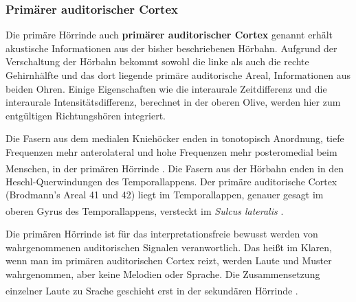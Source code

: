 \documentclass[12pt,a4paper,pdftex]{article}
\begin{document}

\subsubsection*{Primärer auditorischer Cortex}

Die primäre Hörrinde auch \textbf{primärer auditorischer Cortex}  genannt erhält akustische Informationen aus der bisher beschriebenen Hörbahn. Aufgrund der Verschaltung der Hörbahn bekommt sowohl die linke als auch die rechte Gehirnhälfte und das dort liegende primäre auditorische Areal, Informationen aus beiden Ohren. Einige Eigenschaften wie die interaurale Zeitdifferenz und die interaurale Intensitätsdifferenz, berechnet in der oberen Olive, werden hier zum entgültigen Richtungshören integriert. 

Die Fasern aus dem medialen Kniehöcker enden in tonotopisch Anordnung, tiefe Frequenzen mehr anterolateral und hohe Frequenzen mehr posteromedial beim Menschen, in der primären Hörrinde \textsuperscript{\cite[9.9]{trepel2011neuroanatomie}}. Die Fasern aus der Hörbahn enden in den Heschl-Querwindungen des Temporallappens. Der primäre auditorische Cortex (Brodmann's Areal 41 und 42) liegt im Temporallappen, genauer gesagt im oberen Gyrus des Temporallappens, versteckt im \textit{Sulcus lateralis} \textsuperscript{\cite[13]{crossman2014neuroanatomy}}. 

Die primären Hörrinde ist für das interpretationsfreie bewusst werden von wahrgenommenen auditorischen Signalen veranwortlich. Das heißt im Klaren, wenn man im primären auditorischen Cortex reizt, werden Laute und Muster wahrgenommen, aber keine Melodien oder Sprache. Die Zusammensetzung einzelner Laute zu Srache geschieht erst in der sekundären Hörrinde \textsuperscript{\cite[9.9]{trepel2011neuroanatomie}}.
\end{document}
